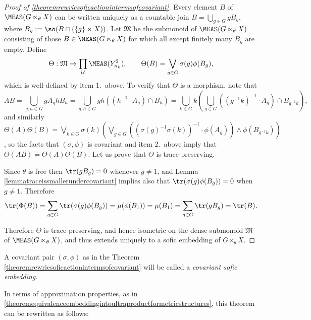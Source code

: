 \begin{proof}[Proof of \ref{theoremrewriesoficactionintermsofcovariant}]
Every element $B$ of $\MEAS(G\ltimes_\theta X)$ can be written uniquely as a countable join $B=\bigcup_{g\in G}gB_g$, where $B_g:=\so(B\cap(\left\{g\right\}\times X))$. Let $\mathfrak{M}$ be the submonoid of $\MEAS(G\ltimes_\theta X)$ consisting of those $B\in\MEAS(G\ltimes_\theta X)$ for which all except finitely many $B_g$ are empty. Define
\[\Theta:\mathfrak{M}\to\prod_\mathcal{U}\MEAS(Y_{n_k}^2),\qquad\Theta(B)=\bigvee_{g\in G}\sigma(g)\phi(B_g),\]
which is well-defined by item 1.\ above. To verify that $\Theta$ is a morphism, note that
\[AB=\bigcup_{g,h\in G}gA_ghB_h=\bigcup_{g,h\in G}gh((h^{-1}\cdot A_g)\cap B_h)=\bigcup_{k\in G}k\left(\bigcup_{g\in G}((g^{-1}k)^{-1}\cdot A_g)\cap B_{g^{-1}k}\right),\]
and similarly $\Theta(A)\Theta(B)=\bigvee_{k\in G}\sigma(k)\left(\bigvee_{g\in G}((\sigma(g)^{-1}\sigma(k))^{-1}\cdot\phi(A_g))\land\phi(B_{g^{-1}k})\right)$, so the facts that $(\sigma,\phi)$ is covariant and item 2.\ above imply that $\Theta(AB)=\Theta(A)\Theta(B)$.
 Let us prove that $\Theta$ is trace-preserving.

Since $\theta$ is free then $\tr(gB_g)=0$ whenever $g\neq 1$, and Lemma \ref{lemmatraceissmallerundercovariant} implies also that $\tr(\sigma(g)\phi(B_g))=0$ when $g\neq 1$. Therefore
\[\tr(\Phi(B))=\sum_{g\in G}\tr(\sigma(g)\phi(B_g))=\mu(\phi(B_1))=\mu(B_1)=\sum_{g\in G}\tr(gB_g)=\tr(B).\]

Therefore $\Theta$ is trace-preserving, and hence isometric on the dense submonoid $\mathfrak{M}$ of $\MEAS(G\ltimes_\theta X)$, and thus extends uniquely to a sofic embedding of $G\ltimes_\theta X$.\qedhere
\end{proof}

\begin{definition}
A covariant pair $(\sigma,\phi)$ as in the Theorem \ref{theoremrewriesoficactionintermsofcovariant} will be called a \emph{covariant sofic embedding}.
\end{definition}

In terms of approximation properties, as in \ref{theoremequivalenceembeddingintoultraproductformetricstructures}, this theorem can be rewritten as follows:

